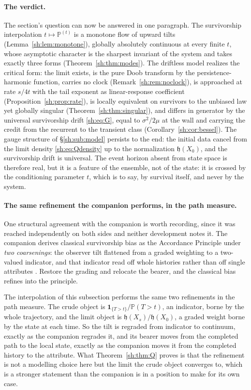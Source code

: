 \documentclass[11pt]{article}
\numberwithin{equation}{section}
\theoremstyle{plain}
\theoremstyle{definition}
\theoremstyle{remark}
\newcommand{\PP}{\mathbb{P}}
\newcommand{\one}{\mathbf{1}}
\newcommand{\hm}{\mathfrak{h}}
\begin{document}
\paragraph{The verdict.}\label{sh:rem:verdict}
The section's question can now be answered in one paragraph. The
survivorship interpolation $t\mapsto\PP^{(t)}$ is a monotone flow of
upward tilts (Lemma~\ref{sh:lem:monotone}), globally absolutely
continuous at every finite $t$, whose asymptotic character is the
sharpest invariant of the system and takes exactly three forms
(Theorem~\ref{sh:thm:modes}). The driftless model realizes the critical
form: the limit exists, is the pure Doob transform by the
persistence-harmonic function, carries no clock
(Remark~\ref{sh:rem:noclock}), is approached at rate $s/4t$ with the tail
exponent as linear-response coefficient
(Proposition~\ref{sh:prop:rate}), is locally equivalent on survivors to
the unbiased law yet globally singular
(Theorem~\ref{sh:thm:singular}), and differs in generator by the
universal survivorship drift \eqref{sh:eq:G}, equal to $\sigma^2/2\mu$
at the wall and carrying the credit from the recurrent to the transient
class (Corollary~\ref{sh:cor:bessel}). The gauge structure of
\S\ref{sh:sub:model} persists to the end: the initial data cancel from
the limit density \eqref{sh:eq:Qdensity} up to the normalization
$\hm(X_0)$, and the survivorship drift is universal. The event horizon
absent from state space is therefore real, but it is a feature of the
ensemble, not of the state: it is crossed by the conditioning parameter
$t$, which is to say, by survival itself, and never by the system.

\paragraph{The same refinement the companion performs, in the path
measure.}\label{sh:rem:coarsenings}
One structural agreement with the companion is worth recording, since
it was reached independently on both sides and neither development
notes it. The companion derives classical survivorship bias as the Accordance
Principle under \emph{two coarsenings}: the observer tilt flattened
from a graded weighting to a two-valued indicator, and that indicator
read off whole histories rather than off single attributes
\cite{Nexus, NexicFoundation}. Restore the grading and relocate the
bearer, and the classical bias refines into the principle.

The interpolation of this subsection performs the same two refinements
in the path measure. The crude object is
$\one_{\{T>t\}}/\PP(T>t)$, an indicator, borne by the whole
trajectory, and the limit object is $\hm(X_s)/\hm(X_0)$, a graded
weight borne by the state at each time. So the tilt is regraded from
indicator to continuum, exactly as the companion regrades it, and its
bearer moves from the completed path to the local state, exactly as the
companion moves it from the completed history to the attribute. What
Theorem~\ref{sh:thm:Q} proves is that the refinement is not a
modelling choice here but the limit the crude object converges to,
which is a stronger statement than the companion is in a position to
make for its own case.
\end{document}
